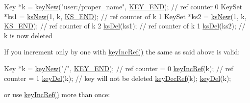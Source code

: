 \begin{DoxyCodeInclude}
Key *k = \hyperlink{group__key_gad23c65b44bf48d773759e1f9a4d43b89}{keyNew}(\textcolor{stringliteral}{"user:/proper\_name"}, \hyperlink{group__key_gga9b703ca49f48b482def322b77d3e6bc8aa8adb6fcb92dec58fb19410eacfdd403}{KEY\_END}); \textcolor{comment}{// ref counter 0}
KeySet *ks1 = \hyperlink{group__keyset_ga671e1aaee3ae9dc13b4834a4ddbd2c3c}{ksNew}(1, k, \hyperlink{group__keyset_ga7a28fce3773b2c873c94ac80b8b4cd54}{KS\_END}); \textcolor{comment}{// ref counter of k 1}
KeySet *ks2 = \hyperlink{group__keyset_ga671e1aaee3ae9dc13b4834a4ddbd2c3c}{ksNew}(1, k, \hyperlink{group__keyset_ga7a28fce3773b2c873c94ac80b8b4cd54}{KS\_END}); \textcolor{comment}{// ref counter of k 2}
\hyperlink{group__keyset_ga27e5c16473b02a422238c8d970db7ac8}{ksDel}(ks1); \textcolor{comment}{// ref counter of k 1}
\hyperlink{group__keyset_ga27e5c16473b02a422238c8d970db7ac8}{ksDel}(ks2); \textcolor{comment}{// k is now deleted}
\end{DoxyCodeInclude}
 If you increment only by one with \hyperlink{group__key_ga6970a6f254d67af7e39f8e469bb162f1}{key\+Inc\+Ref()} the same as said above is valid\+:


\begin{DoxyCodeInclude}
Key *k = \hyperlink{group__key_gad23c65b44bf48d773759e1f9a4d43b89}{keyNew}(\textcolor{stringliteral}{"/"}, \hyperlink{group__key_gga9b703ca49f48b482def322b77d3e6bc8aa8adb6fcb92dec58fb19410eacfdd403}{KEY\_END}); \textcolor{comment}{// ref counter = 0}
\hyperlink{group__key_ga6970a6f254d67af7e39f8e469bb162f1}{keyIncRef}(k); \textcolor{comment}{// ref counter = 1}
\hyperlink{group__key_ga3df95bbc2494e3e6703ece5639be5bb1}{keyDel}(k); \textcolor{comment}{// key will not be deleted}
\hyperlink{group__key_ga2c6433ca22109e4e141946057eccb283}{keyDecRef}(k);
\hyperlink{group__key_ga3df95bbc2494e3e6703ece5639be5bb1}{keyDel}(k);
\end{DoxyCodeInclude}
 or use \hyperlink{group__key_ga6970a6f254d67af7e39f8e469bb162f1}{key\+Inc\+Ref()} more than once\+:


